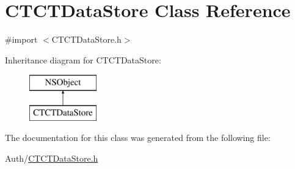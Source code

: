 \hypertarget{interface_c_t_c_t_data_store}{\section{C\-T\-C\-T\-Data\-Store Class Reference}
\label{interface_c_t_c_t_data_store}
}


{\ttfamily \#import $<$C\-T\-C\-T\-Data\-Store.\-h$>$}

Inheritance diagram for C\-T\-C\-T\-Data\-Store\-:\begin{figure}[H]
\begin{center}
\leavevmode
\includegraphics[height=2.000000cm]{interface_c_t_c_t_data_store}
\end{center}
\end{figure}


The documentation for this class was generated from the following file\-:\begin{DoxyCompactItemize}
\item 
Auth/\hyperlink{_c_t_c_t_data_store_8h}{C\-T\-C\-T\-Data\-Store.\-h}\end{DoxyCompactItemize}
